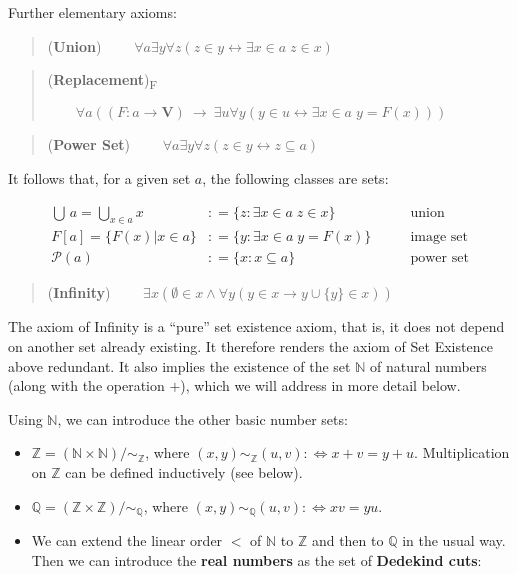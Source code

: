 \documentclass{article}
\newcommand{\Nat}{\mathbb{N}}
\newcommand{\Integer}{\mathbb{Z}}
\newcommand{\Rat}{\mathbb{Q}}
\begin{document}
Further elementary axioms:

\begin{quote}
(\textbf{Union})   $\qquad \forall a \exists y \forall z (z \in y  \leftrightarrow  \exists x \in a \; z \in x)$
\end{quote}

\begin{quote}
(\textbf{Replacement})\textsubscript{F} \newline

$\qquad \forall a  ((F: a \to \mathbf{V}) \: \rightarrow \: \exists u \forall y (y \in u \leftrightarrow \exists x \in a \; y = F(x)))$
\end{quote}

\begin{quote}
(\textbf{Power Set}) $\qquad \forall a \exists y \forall z (z \in y \leftrightarrow z \subseteq a)$
\end{quote}

It follows that, for a given set $a$, the following classes are sets:

\begin{align*}
\bigcup \, a = \bigcup_{x \in a} x & : = \{z \colon \exists x \in a \; z \in x \}  &  \qquad  \text{union}\\
F[a] = \{F(x)|x \in a\} &: = \{y\colon \exists x \in a \; y = F(x) \}  &  \qquad  \text{image set}\\
\mathcal{P}(a) &: = \{x\colon x \subseteq a\} & \qquad  \text{power set}
\end{align*}

\begin{quote}
(\textbf{Infinity}) $\qquad \exists x ( \emptyset \in x \wedge \forall y ( y \in x \to y \cup \{y\} \in x))$
\end{quote}

The axiom of Infinity is a ``pure'' set existence axiom, that is, it does not depend on another set already existing. It therefore renders the axiom of Set Existence above redundant.
It also implies the existence of the set $\Nat$ of natural numbers (along with the operation $+$), which we will address in more detail below.

Using $\Nat$, we can introduce the other basic number sets:

\begin{itemize}
\item $\Integer = (\Nat\times\Nat)/ \sim_\Integer$, where $(x,y) \sim_\Integer (u,v) :\Leftrightarrow  x+v = y+u$. Multiplication on $\Integer$ can be defined inductively (see below).
\item $\Rat = (\Integer\times\Integer)/\sim_\Rat$, where $(x,y) \sim_\Rat (u,v) :\Leftrightarrow xv = yu$.
\item We can extend the linear order $<$ of $\Nat$ to $\Integer$ and then to $\Rat$ in the usual way. Then we can introduce the \textbf{real numbers} as the set of \textbf{Dedekind cuts}:
\end{itemize}
\end{document}
